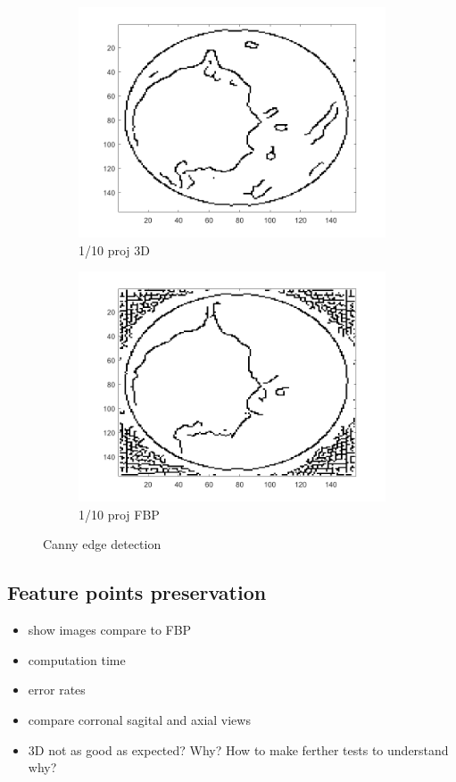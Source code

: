 \begin{figure}[ht!]
\begin{subfigure}[b]{0.24\textwidth}
            	\centering 
            	\includegraphics[width=\textwidth]{../../data/res/SB_Reconstruction/Edges/3D/it250_proj1_10.png}
            	\caption{1/10 proj 3D}    
            	\label{subfig:FBP1156p}
        	\end{subfigure}
        	\begin{subfigure}[b]{0.24\textwidth}  
            	\centering 
            	\includegraphics[width=\textwidth]{../../data/res/FBP/Edges/proj_1_10.png}
            	\caption{1/10 proj FBP}    
            	\label{subfig:FBP1156p}
        	\end{subfigure}
        	\caption{Canny edge detection}
        	\label{fig:Canny}
    	\end{figure}


\subsection{Feature points preservation}

\begin{itemize}
	\item show images compare to FBP
	\item computation time
	\item error rates
	\item compare corronal sagital and axial views
	\item 3D not as good as expected? Why? How to make ferther tests to understand why?
\end{itemize}
